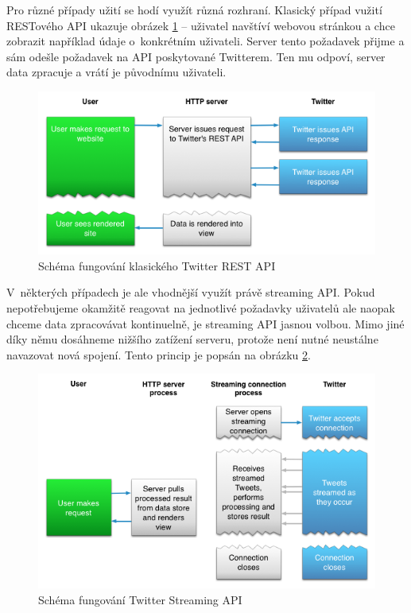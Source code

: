 \documentclass[thesis=B,czech]{FITthesis}[2012/06/26]
\begin{document}
	Pro různé případy užití se hodí využít různá rozhraní. Klasický případ vužití RESTového API ukazuje obrázek \ref{fig:twitter_rest} -- uživatel navštíví webovou stránkou a chce zobrazit například údaje o~konkrétním uživateli. Server tento požadavek přijme a sám odešle požadavek na API poskytované Twitterem. Ten mu odpoví, server data zpracuje a vrátí je původnímu uživateli. 

\begin{figure}[h!]
   	\centering
   	\includegraphics[width=1\textwidth]{images/twitter-rest.png}
   	\caption{Schéma fungování klasického Twitter REST API\cite{twitter-rest-stream}}
   	\label{fig:twitter_rest}
\end{figure}

	V~některých případech je ale vhodnější využít právě streaming API. Pokud nepotřebujeme okamžitě reagovat na jednotlivé požadavky uživatelů ale naopak chceme data zpracovávat kontinuelně, je streaming API jasnou volbou. Mimo jiné díky němu dosáhneme nižšího zatížení serveru, protože není nutné neustálne navazovat nová spojení. Tento princip je popsán na obrázku \ref{fig:twitter_streaming}. 

\begin{figure}[h!]
   	\centering
   	\includegraphics[width=1\textwidth]{images/twitter-streaming.png}
   	\caption{Schéma fungování Twitter Streaming API\cite{twitter-rest-stream}}
   	\label{fig:twitter_streaming}
\end{figure}
\end{document}
